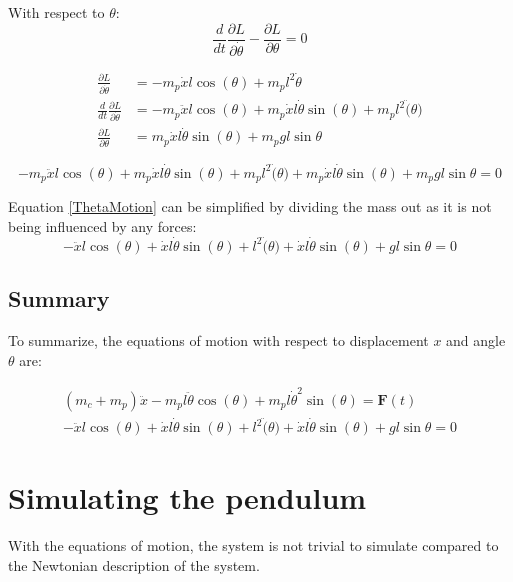 \documentclass{article}
\newcommand{\pfrac}[2]{\frac{\partial #1}{\partial #2}}
\begin{document}
With respect to $\theta$:
$$
	\frac{d}{dt} \pfrac{L}{\dot{\theta}} - \pfrac{L}{\theta} = 0
$$

\begin{align}
	\pfrac{L}{\dot{\theta}}              & = -m_p\dot{x}l\cos(\theta) + m_p l^2 \dot{\theta}                                         \\
	\frac{d}{dt} \pfrac{L}{\dot{\theta}} & = -m_p\ddot{x}l\cos(\theta) + m_p\dot{x}l\dot{\theta}\sin(\theta) + m_p l^2 \ddot(\theta) \\
	\pfrac{L}{\theta}                    & = m_p\dot{x}l\dot{\theta}\sin(\theta) + m_p g l \sin{\theta}
\end{align}

\begin{equation} \label{ThetaMotion}
	-m_p\ddot{x}l\cos(\theta) + m_p\dot{x}l\dot{\theta}\sin(\theta) + m_p l^2 \ddot(\theta) + m_p\dot{x}l\dot{\theta}\sin(\theta) + m_p g l \sin{\theta} = 0
\end{equation}

Equation \eqref{ThetaMotion} can be simplified by dividing the mass out as it is not being influenced by any forces:
\begin{equation}
	-\ddot{x}l\cos(\theta) + \dot{x}l\dot{\theta}\sin(\theta) + l^2 \ddot(\theta) + \dot{x}l\dot{\theta}\sin(\theta) + g l \sin{\theta} = 0
\end{equation}

\subsection{Summary}
To summarize, the equations of motion with respect to displacement $x$ and angle $\theta$ are:

\begin{align}
	(m_c + m_p)\ddot{x} - m_pl\ddot{\theta}\cos(\theta) + m_pl\dot{\theta}^2\sin(\theta) = \mathbf{F}(t) \\
	-\ddot{x}l\cos(\theta) + \dot{x}l\dot{\theta}\sin(\theta) + l^2 \ddot(\theta) + \dot{x}l\dot{\theta}\sin(\theta) + g l \sin{\theta} = 0
\end{align}


\section{Simulating the pendulum}
With the equations of motion, the system is not trivial to simulate compared to
the Newtonian description of the system.
\end{document}
